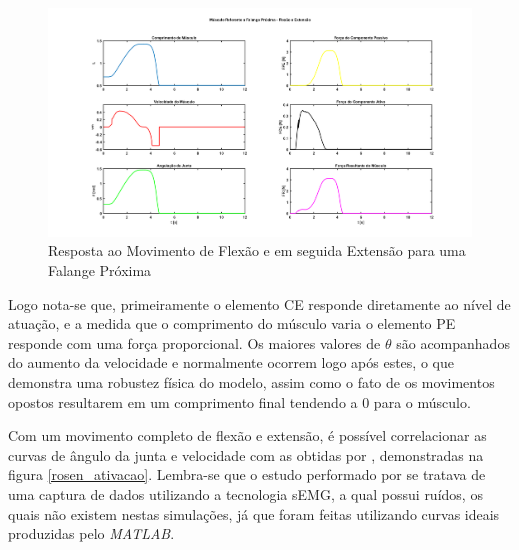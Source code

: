 \begin{figure}[H]
\centering
\includegraphics[width = 1\textwidth]{img/flexao_extensao.png}
\caption[Resposta ao Movimento de Flexão e em seguida Extensão para uma Falange Próxima]{Resposta ao Movimento de Flexão e em seguida Extensão para uma Falange Próxima}
\label{sim_flexao_extensao}
\end{figure}

Logo nota-se que, primeiramente o elemento CE responde diretamente ao nível de atuação, e a medida que o comprimento do músculo varia o elemento PE responde com uma força proporcional. Os maiores valores de $\theta$ são acompanhados do aumento da velocidade e normalmente ocorrem logo após estes, o que demonstra uma robustez física do modelo, assim como o fato de os movimentos opostos resultarem em um comprimento final tendendo a 0 para o músculo. 

Com um movimento completo de flexão e extensão, é possível correlacionar as curvas de ângulo da junta e velocidade com as obtidas por \cite{rosen1999performances}, demonstradas na figura \ref{rosen_ativacao}. Lembra-se que o estudo performado por \cite{rosen1999performances} se tratava de uma captura de dados utilizando a tecnologia sEMG, a qual possui ruídos, os quais não existem nestas simulações, já que foram feitas utilizando curvas ideais produzidas pelo \textit{MATLAB}.

